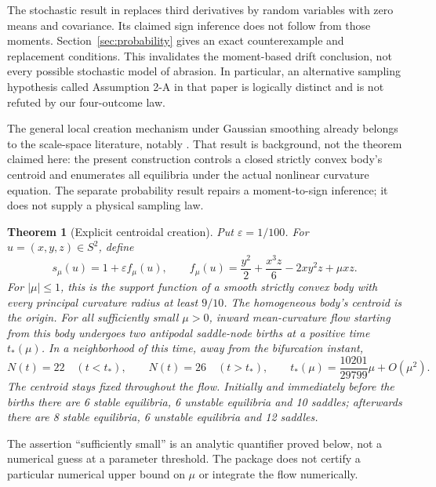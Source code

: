 \documentclass[11pt,a4paper]{article}
\newtheorem{theorem}{Theorem}[section]
\theoremstyle{remark}\newtheorem{remark}[theorem]{Remark}
\begin{document}
The stochastic result in \citet[Assumption 2 and equations (49)--(53)]{D15} replaces third derivatives by random variables with zero means and covariance. Its claimed sign inference does not follow from those moments. Section~\ref{sec:probability} gives an exact counterexample and replacement conditions. This invalidates the moment-based drift conclusion, not every possible stochastic model of abrasion. In particular, an alternative sampling hypothesis called Assumption 2-A in that paper is logically distinct and is not refuted by our four-outcome law.

The general local creation mechanism under Gaussian smoothing already belongs to the scale-space literature, notably \citet{Damon95}. That result is background, not the theorem claimed here: the present construction controls a closed strictly convex body's centroid and enumerates all equilibria under the actual nonlinear curvature equation. The separate probability result repairs a moment-to-sign inference; it does not supply a physical sampling law.

\begin{theorem}[Explicit centroidal creation]\label{thm:main}
Put \(\varepsilon=1/100\). For \(u=(x,y,z)\in S^2\), define
\begin{equation}\label{eq:support}
 s_\mu(u)=1+\varepsilon f_\mu(u),\qquad
 f_\mu(u)=\frac{y^2}{2}+\frac{x^3z}{6}-2xy^2z+\mu xz.
\end{equation}
For \(|\mu|\le1\), this is the support function of a smooth strictly convex body with every principal curvature radius at least \(9/10\). The homogeneous body's centroid is the origin. For all sufficiently small \(\mu>0\), inward mean-curvature flow starting from this body undergoes two antipodal saddle-node births at a positive time \(t_*(\mu)\). In a neighborhood of this time, away from the bifurcation instant,
\[
 N(t)=22\quad(t<t_*),\qquad N(t)=26\quad(t>t_*),
 \qquad t_*(\mu)=\frac{10201}{29799}\mu+O(\mu^2).
\]
The centroid stays fixed throughout the flow. Initially and immediately before the births there are 6 stable equilibria, 6 unstable equilibria and 10 saddles; afterwards there are 8 stable equilibria, 6 unstable equilibria and 12 saddles.
\end{theorem}

The assertion ``sufficiently small'' is an analytic quantifier proved below, not a numerical guess at a parameter threshold. The package does not certify a particular numerical upper bound on \(\mu\) or integrate the flow numerically.
\end{document}
